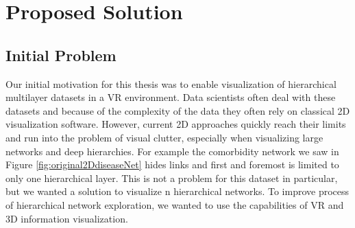 \chapter{Proposed Solution}
\label{chap:proposed-Solution}
\section{Initial Problem}

Our initial motivation for this thesis was to enable visualization of hierarchical multilayer datasets in a VR environment. 
Data scientists often deal with these datasets and because of the complexity of the data they often rely on classical 2D visualization software.
However, current 2D approaches quickly reach their limits and run into the problem of visual clutter, especially when visualizing large networks and deep hierarchies. For example the comorbidity network we saw in Figure \ref{fig:original2DdiseaseNet} hides links and first and foremost is limited to only one hierarchical layer. This is not a problem for this dataset in particular, but we wanted a solution to visualize n hierarchical networks.
To improve process of hierarchical network exploration, we wanted to use the capabilities of VR and 3D information visualization. 

